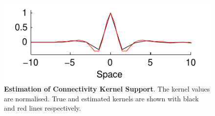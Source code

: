 \documentclass[]{article}
\begin{document}
\begin{figure}[!ht]
\begin{center}
\includegraphics{./Figures/KernelWidthEstimation2.pdf}
\end{center}
\caption{{\bf Estimation of Connectivity Kernel Support}. The kernel values are normalised. True  and estimated kernels are shown with black and red lines respectively.}
\label{fig:KernelWidth2}
\end{figure}

\newpage
\end{document}
